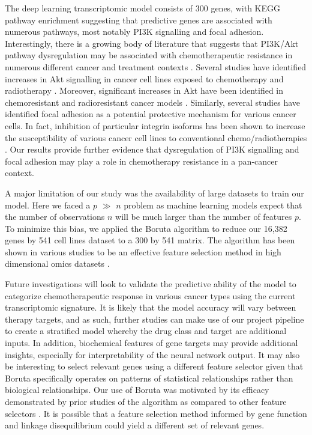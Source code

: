 \documentclass[10pt, letterpaper, twocolumn]{article}
\begin{document}
The deep learning transcriptomic model consists of 300 genes, with KEGG pathway enrichment suggesting that predictive genes are associated with numerous pathways, most notably PI3K signalling and focal adhesion. Interestingly, there is a growing body of literature that suggests that PI3K/Akt pathway dysregulation may be associated with chemotherapeutic resistance in numerous different cancer and treatment contexts \cite{huang_2009}. Several studies have identified increases in Akt signalling in cancer cell lines exposed to chemotherapy and radiotherapy \cite{mapk, wort, phos}. Moreover, significant increases in Akt have been identified in chemoresistant and radioresistant cancer models \cite{cholangio}. Similarly, several studies have identified focal adhesion as a potential protective mechanism for various cancer cells. In fact, inhibition of particular integrin isoforms has been shown to increase the susceptibility of various cancer cell lines to conventional chemo/radiotherapies \cite{focal_adhesion}. Our results provide further evidence that dysregulation of PI3K signalling and focal adhesion may play a role in chemotherapy resistance in a pan-cancer context.

A major limitation of our study was the availability of large datasets to train our model. Here we faced a $p$ $\gg$ $n$ problem as machine learning models expect that the number of observations $n$ will be much larger than the number of features $p$. To minimize this bias, we applied the Boruta algorithm to reduce our 16,382 genes by 541 cell lines dataset to a 300 by 541 matrix. The algorithm has been shown in various studies to be an effective feature selection method in high dimensional omics datasets \cite{boruta}.

Future investigations will look to validate the predictive ability of the model to categorize chemotherapeutic response in various cancer types using the current transcriptomic signature. It is likely that the model accuracy will vary between therapy targets, and as such, further studies can make use of our project pipeline to create a stratified model whereby the drug class and target are additional inputs. In addition, biochemical features of gene targets may provide additional insights, especially for interpretability of the neural network output. It may also be interesting to select relevant genes using a different feature selector given that Boruta specifically operates on patterns of statistical relationships rather than biological relationships. Our use of Boruta was motivated by its efficacy demonstrated by prior studies of the algorithm as compared to other feature selectors \cite{boruta, deep_cell}. It is possible that a feature selection method informed by gene function and linkage disequilibrium could yield a different set of relevant genes.
\end{document}
